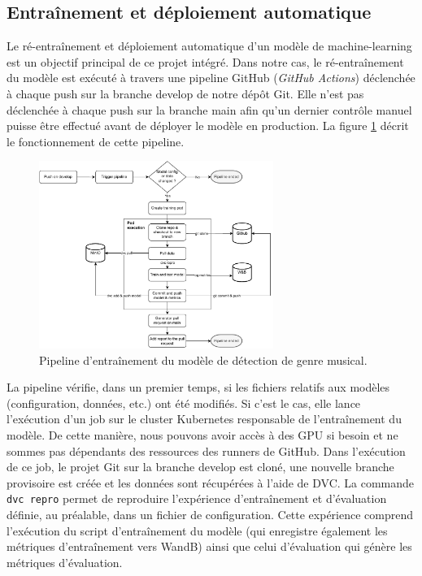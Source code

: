 \subsection{Entraînement et déploiement automatique}\label{sec:train_deploy}

Le ré-entraînement et déploiement automatique d'un modèle de machine-learning est un objectif principal de ce projet intégré. Dans notre cas, le ré-entraînement du modèle est exécuté à travers une pipeline GitHub (\textit{GitHub Actions}) déclenchée à chaque push sur la branche develop de notre dépôt Git. Elle n'est pas déclenchée à chaque push sur la branche main afin qu'un dernier contrôle manuel puisse être effectué avant de déployer le modèle en production. La figure \ref{fig:training_pipeline} décrit le fonctionnement de cette pipeline.

\begin{figure}[H]
    \centering
    \includegraphics[width=0.68\textwidth]{rsc/training_pipeline.pdf}
    \caption{Pipeline d'entraînement du modèle de détection de genre musical.}
    \label{fig:training_pipeline}
\end{figure}

La pipeline vérifie, dans un premier temps, si les fichiers relatifs aux modèles (configuration, données, etc.) ont été modifiés. Si c'est le cas, elle lance l'exécution d'un job sur le cluster Kubernetes responsable de l'entraînement du modèle. De cette manière, nous pouvons avoir accès à des GPU si besoin et ne sommes pas dépendants des ressources des runners de GitHub. Dans l'exécution de ce job, le projet Git sur la branche develop est cloné, une nouvelle branche provisoire est créée et les données sont récupérées à l'aide de DVC. La commande \verb|dvc repro| permet de reproduire l'expérience d'entraînement et d'évaluation définie, au préalable, dans un fichier de configuration. Cette expérience comprend l'exécution du script d'entraînement du modèle (qui enregistre également les métriques d'entraînement vers WandB) ainsi que celui d'évaluation qui génère les métriques d'évaluation.

